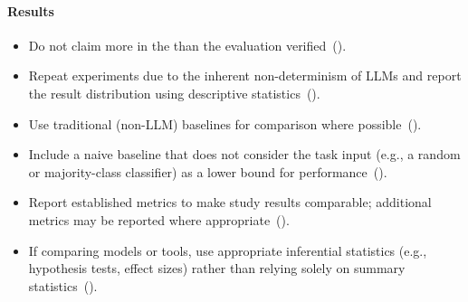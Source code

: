 \paragraph{\textbf{Results}}
\begin{itemize}[label={},leftmargin=*]
    \item \iconM Do not claim more in the \paper than the evaluation verified~().
    \item \iconS Repeat experiments due to the inherent non-determinism of LLMs and report the result distribution using descriptive statistics~().
    \item \iconS Use traditional (non-LLM) baselines for comparison where possible~().
    \item \iconS Include a naive baseline that does not consider the task input (e.g., a random or majority-class classifier) as a lower bound for performance~().
    \item \iconS Report established metrics to make study results comparable; additional metrics may be reported where appropriate~().
    \item \iconS {} If comparing models or tools, use appropriate inferential statistics (e.g., hypothesis tests, effect sizes) rather than relying solely on summary statistics~().
\end{itemize}

